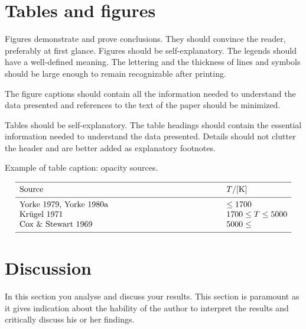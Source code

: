 \documentclass[a4paper,10pt]{article}
\begin{document}
\newpage
\section{Tables and figures}
Figures demonstrate and prove conclusions. They should convince 
the reader, preferably at first glance. Figures should be self-explanatory. 
The legends should have a well-defined meaning. The lettering and the 
thickness of lines and symbols should be large enough to remain recognizable 
after printing.

The figure captions should contain all the information needed to 
understand the data presented and references to the text of the paper 
should be minimized.



Tables should be self-explanatory. The table headings should contain 
the essential information needed to understand the data presented. 
Details should not clutter the header and are better added as explanatory 
footnotes.

\begin{table}[htb]
      \caption[]{Example of table caption: opacity sources.}
         \label{KapSou}
     $$ 
         \begin{array}{p{0.7\linewidth}l}
            \hline
            \noalign{\smallskip}
            Source      &  T / {[\mathrm{K}]} \\
            \noalign{\smallskip}
            \hline
            \noalign{\smallskip}
            Yorke 1979, Yorke 1980a & \leq 1700           \\
            Kr\"ugel 1971           & 1700 \leq T \leq 5000 \\
            Cox \& Stewart 1969     & 5000 \leq             \\
            \noalign{\smallskip}
            \hline
         \end{array}
     $$ 
\end{table}

\section{Discussion}
In this section you analyse and discuss your results.
This section is paramount as it gives indication about the 
hability of the author to interpret the results and 
critically discuss his or her findings.
\end{document}
